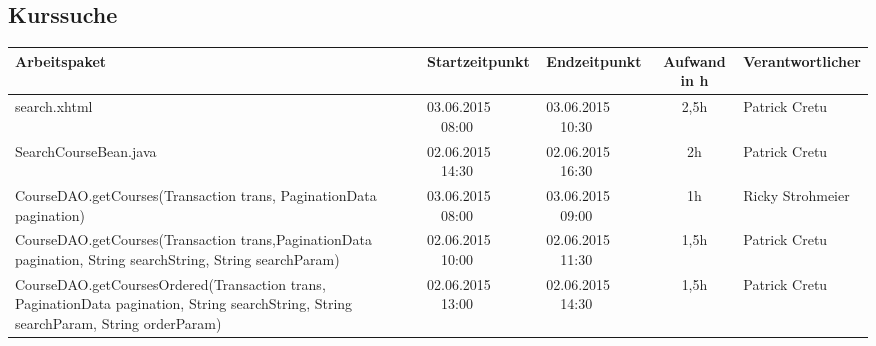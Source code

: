 \begin{landscape}
\subsection{Kurssuche}
\begin{tabular}{|p{10.3cm}|p{3.2cm}|p{3.2cm}|c|p{3.5cm}|}
	\hline  \textbf{Arbeitspaket} & \textbf{Startzeitpunkt} & \textbf{Endzeitpunkt} & \textbf{Aufwand in h} & \textbf{Verantwortlicher} \\ 
	\hline   search.xhtml                                         & 03.06.2015 \ \ 08:00        & 03.06.2015 \ \ 10:30        &  2,5h                 & Patrick Cretu\\ 
	\hline   SearchCourseBean.java                                & 02.06.2015 \ \ 14:30        & 02.06.2015 \ \ 16:30        &  2h                 & Patrick Cretu\\ 
	\hline   CourseDAO.getCourses(Transaction trans, PaginationData pagination)                                      & 03.06.2015 \ \ 08:00        & 03.06.2015 \ \ 09:00        &  1h                 & Ricky Strohmeier\\ 
	\hline  CourseDAO.getCourses(Transaction trans,PaginationData pagination, String searchString, String searchParam)& 02.06.2015 \ \ 10:00        & 02.06.2015 \ \ 11:30        &  1,5h                 & Patrick Cretu\\ 
	\hline  CourseDAO.getCoursesOrdered(Transaction trans, PaginationData pagination, String searchString, String searchParam, String orderParam)& 02.06.2015 \ \ 13:00        & 02.06.2015 \ \ 14:30        &  1,5h                 & Patrick Cretu\\ 
	\hline 
\end{tabular} \ \\
\ \\
\end{landscape}



